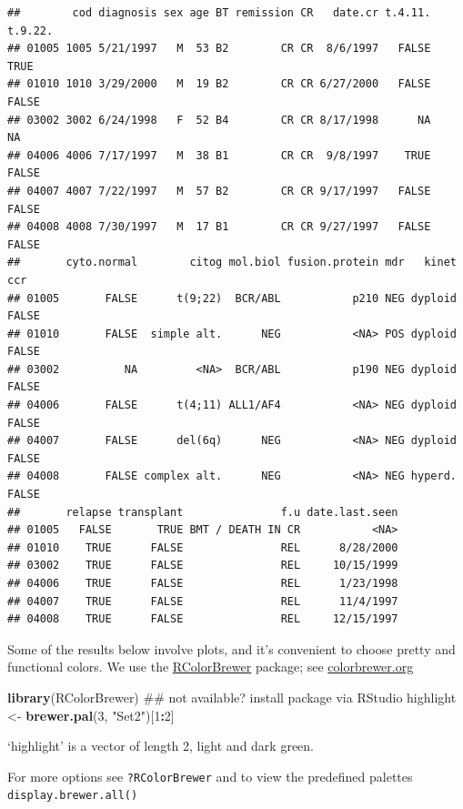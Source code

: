 \documentclass[]{article}
\newenvironment{Shaded}{\begin{snugshade}}{\end{snugshade}}
\newcommand{\KeywordTok}[1]{\textcolor[rgb]{0.13,0.29,0.53}{\textbf{#1}}}
\newcommand{\DecValTok}[1]{\textcolor[rgb]{0.00,0.00,0.81}{#1}}
\newcommand{\StringTok}[1]{\textcolor[rgb]{0.31,0.60,0.02}{#1}}
\newcommand{\OperatorTok}[1]{\textcolor[rgb]{0.81,0.36,0.00}{\textbf{#1}}}
\newcommand{\NormalTok}[1]{#1}
\theoremstyle{definition}
\theoremstyle{definition}
\theoremstyle{remark}
\begin{document}
\begin{verbatim}
##        cod diagnosis sex age BT remission CR   date.cr t.4.11. t.9.22.
## 01005 1005 5/21/1997   M  53 B2        CR CR  8/6/1997   FALSE    TRUE
## 01010 1010 3/29/2000   M  19 B2        CR CR 6/27/2000   FALSE   FALSE
## 03002 3002 6/24/1998   F  52 B4        CR CR 8/17/1998      NA      NA
## 04006 4006 7/17/1997   M  38 B1        CR CR  9/8/1997    TRUE   FALSE
## 04007 4007 7/22/1997   M  57 B2        CR CR 9/17/1997   FALSE   FALSE
## 04008 4008 7/30/1997   M  17 B1        CR CR 9/27/1997   FALSE   FALSE
##       cyto.normal        citog mol.biol fusion.protein mdr   kinet   ccr
## 01005       FALSE      t(9;22)  BCR/ABL           p210 NEG dyploid FALSE
## 01010       FALSE  simple alt.      NEG           <NA> POS dyploid FALSE
## 03002          NA         <NA>  BCR/ABL           p190 NEG dyploid FALSE
## 04006       FALSE      t(4;11) ALL1/AF4           <NA> NEG dyploid FALSE
## 04007       FALSE      del(6q)      NEG           <NA> NEG dyploid FALSE
## 04008       FALSE complex alt.      NEG           <NA> NEG hyperd. FALSE
##       relapse transplant               f.u date.last.seen
## 01005   FALSE       TRUE BMT / DEATH IN CR           <NA>
## 01010    TRUE      FALSE               REL      8/28/2000
## 03002    TRUE      FALSE               REL     10/15/1999
## 04006    TRUE      FALSE               REL      1/23/1998
## 04007    TRUE      FALSE               REL      11/4/1997
## 04008    TRUE      FALSE               REL     12/15/1997
\end{verbatim}

Some of the results below involve plots, and it's convenient to choose
pretty and functional colors. We use the
\href{https://cran.r-project.org/?package=RColorBrewer}{RColorBrewer}
package; see \href{http://colorbrewer.org}{colorbrewer.org}

\begin{Shaded}
\begin{Highlighting}[]
\KeywordTok{library}\NormalTok{(RColorBrewer)  ## not available? install package via RStudio}
\NormalTok{highlight <-}\StringTok{ }\KeywordTok{brewer.pal}\NormalTok{(}\DecValTok{3}\NormalTok{, }\StringTok{"Set2"}\NormalTok{)[}\DecValTok{1}\OperatorTok{:}\DecValTok{2}\NormalTok{]}
\end{Highlighting}
\end{Shaded}

`highlight' is a vector of length 2, light and dark green.

For more options see \texttt{?RColorBrewer} and to view the predefined
palettes \texttt{display.brewer.all()}
\end{document}
